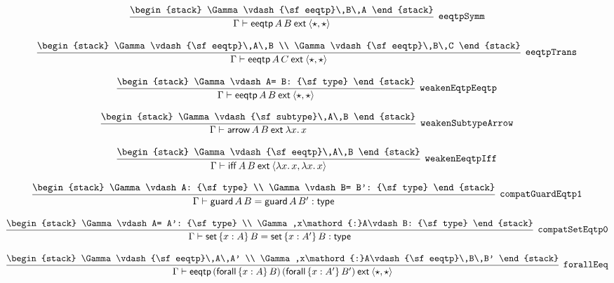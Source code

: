\[
\infer[{\tt eeqtpSymm}]{\Gamma \vdash {\sf eeqtp}\,A\,B\:{\sf ext}\:\langle \star ,\star \rangle }{
\begin{stack}
\Gamma \vdash {\sf eeqtp}\,B\,A
\end{stack}}
\]

\[
\infer[{\tt eeqtpTrans}]{\Gamma \vdash {\sf eeqtp}\,A\,C\:{\sf ext}\:\langle \star ,\star \rangle }{
\begin{stack}
\Gamma \vdash {\sf eeqtp}\,A\,B
\\
\Gamma \vdash {\sf eeqtp}\,B\,C
\end{stack}}
\]

\[
\infer[{\tt weakenEqtpEeqtp}]{\Gamma \vdash {\sf eeqtp}\,A\,B\:{\sf ext}\:\langle \star ,\star \rangle }{
\begin{stack}
\Gamma \vdash A= B: {\sf type}
\end{stack}}
\]

\[
\infer[{\tt weakenSubtypeArrow}]{\Gamma \vdash {\sf arrow}\,A\,B\:{\sf ext}\:\lambda x.\,x}{
\begin{stack}
\Gamma \vdash {\sf subtype}\,A\,B
\end{stack}}
\]

\[
\infer[{\tt weakenEeqtpIff}]{\Gamma \vdash {\sf iff}\,A\,B\:{\sf ext}\:\langle \lambda x.\,x,\lambda x.\,x\rangle }{
\begin{stack}
\Gamma \vdash {\sf eeqtp}\,A\,B
\end{stack}}
\]

\[
\infer[{\tt compatGuardEqtp1}]{\Gamma \vdash {\sf guard}\,A\,B= {\sf guard}\,A\,B': {\sf type}}{
\begin{stack}
\Gamma \vdash A: {\sf type}
\\
\Gamma \vdash B= B': {\sf type}
\end{stack}}
\]

\[
\infer[{\tt compatSetEqtp0}]{\Gamma \vdash {\sf set}\,\{x : A\}\,B= {\sf set}\,\{x : A'\}\,B: {\sf type}}{
\begin{stack}
\Gamma \vdash A= A': {\sf type}
\\
\Gamma ,x\mathord{:}A\vdash B: {\sf type}
\end{stack}}
\]

\[
\infer[{\tt forallEeq}]{\Gamma \vdash {\sf eeqtp}\,({\sf forall}\,\{x : A\}\,B)\,({\sf forall}\,\{x : A'\}\,B')\:{\sf ext}\:\langle \star ,\star \rangle }{
\begin{stack}
\Gamma \vdash {\sf eeqtp}\,A\,A'
\\
\Gamma ,x\mathord{:}A\vdash {\sf eeqtp}\,B\,B'
\end{stack}}
\]

